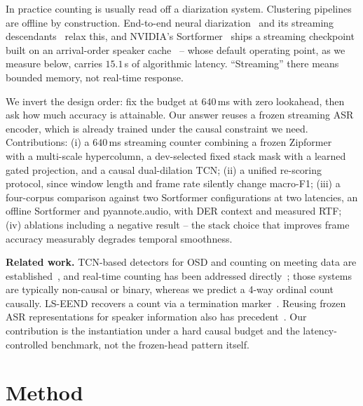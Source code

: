 \documentclass[10pt,conference]{IEEEtran}
\begin{document}
In practice counting is usually read off a diarization system. Clustering
pipelines~\cite{bredin2023pyannote,han2024diarizen} are offline by
construction. End-to-end neural diarization~\cite{fujita2019eend} and its
streaming descendants~\cite{liang2024fseend,liang2025lseend} relax this, and
NVIDIA's Sortformer~\cite{park2024sortformer} ships a streaming checkpoint
built on an arrival-order speaker cache~\cite{medennikov2025streamingsortformer}
-- whose default operating point, as we measure below, carries $15.1$\,s of
algorithmic latency. ``Streaming'' there means bounded memory, not real-time
response.

We invert the design order: fix the budget at $640$\,ms with zero lookahead,
then ask how much accuracy is attainable. Our answer reuses a frozen
streaming ASR encoder, which is already trained under the causal constraint
we need. Contributions: (i) a $640$\,ms streaming counter combining a frozen
Zipformer~\cite{yao2024zipformer} with a multi-scale hypercolumn, a
dev-selected fixed stack mask with a learned gated projection, and a causal
dual-dilation TCN; (ii) a unified re-scoring protocol, since window length
and frame rate silently change macro-F1;
(iii) a four-corpus comparison against two Sortformer configurations at two
latencies, an offline Sortformer and pyannote.audio, with DER context and
measured RTF; (iv) ablations including a negative result -- the stack choice
that improves frame accuracy measurably degrades temporal smoothness.

\textbf{Related work.} TCN-based detectors for OSD and counting on meeting
data are established~\cite{cornell2020osd,bullock2020overlap}, and
real-time counting has been addressed
directly~\cite{yousefi2021realtime}; those systems are typically non-causal
or binary, whereas we predict a 4-way ordinal count causally. LS-EEND
recovers a count via a termination marker~\cite{liang2025lseend}. Reusing
frozen ASR representations for speaker information also has
precedent~\cite{msaasr2024}. Our contribution is the instantiation under a
hard causal budget and the latency-controlled benchmark, not the frozen-head
pattern itself.

\section{Method}
\label{sec:method}
\end{document}
